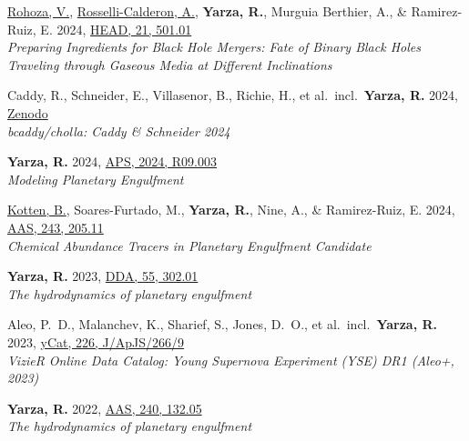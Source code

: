 \item \underline{Rohoza, V.}, \underline{Rosselli-Calderon, A.}, \textbf{Yarza, R.}, Murguia Berthier, A., \& Ramirez-Ruiz, E. 2024, \href{https://ui.adsabs.harvard.edu/abs/2024HEAD...2150101R}{HEAD, 21, 501.01}\\\textit{Preparing Ingredients for Black Hole Mergers: Fate of Binary Black Holes Traveling through Gaseous Media at Different Inclinations}

\item Caddy, R., Schneider, E., Villasenor, B., Richie, H., et al.\ incl.\ \textbf{Yarza, R.} 2024, \href{https://ui.adsabs.harvard.edu/abs/2024zndo..10927183C}{Zenodo}\\\textit{bcaddy/cholla: Caddy \& Schneider 2024}

\item \textbf{Yarza, R.} 2024, \href{https://ui.adsabs.harvard.edu/abs/2024APS..APRR09003Y}{APS, 2024, R09.003}\\\textit{Modeling Planetary Engulfment}

\item \underline{Kotten, B.}, Soares-Furtado, M., \textbf{Yarza, R.}, Nine, A., \& Ramirez-Ruiz, E. 2024, \href{https://ui.adsabs.harvard.edu/abs/2024AAS...24320511K}{AAS, 243, 205.11}\\\textit{Chemical Abundance Tracers in Planetary Engulfment Candidate}

\item \textbf{Yarza, R.} 2023, \href{https://ui.adsabs.harvard.edu/abs/2023DDA....5430201Y}{DDA, 55, 302.01}\\\textit{The hydrodynamics of planetary engulfment}

\item Aleo, P.~D., Malanchev, K., Sharief, S., Jones, D.~O., et al.\ incl.\ \textbf{Yarza, R.} 2023, \href{https://ui.adsabs.harvard.edu/abs/2023yCat..22660009A}{yCat, 226, J/ApJS/266/9}\\\textit{VizieR Online Data Catalog: Young Supernova Experiment (YSE) DR1 (Aleo+, 2023)}

\item \textbf{Yarza, R.} 2022, \href{https://ui.adsabs.harvard.edu/abs/2022AAS...24013205Y}{AAS, 240, 132.05}\\\textit{The hydrodynamics of planetary engulfment}

